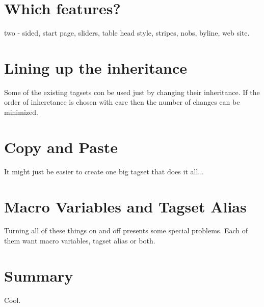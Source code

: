 \section{Which features?}
two - sided, start page, sliders, table head style, stripes, nobs, byline, web site.

\section{Lining up the inheritance}
Some of the existing tagsets con be used just by changing their inheritance.  If the
order of inheretance is chosen with care then the number of changes can be minimized.

\section{Copy and Paste}
It might just be easier to create one big tagset that does it all...

\section{Macro Variables and Tagset Alias}
Turning all of these things on and off presents some special problems.  Each of them
want macro variables, tagset alias or both.

\section{Summary}
Cool.
